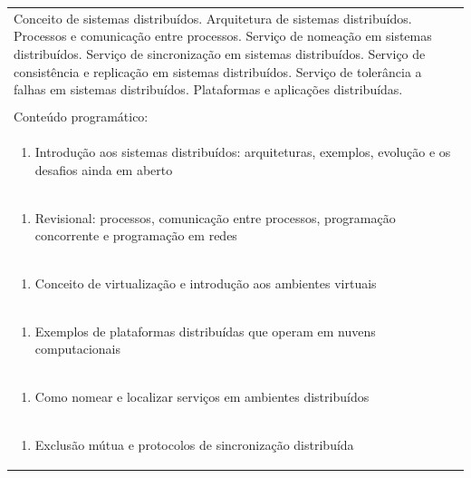 \documentclass[11pt]{article}
\begin{document}
\begin{center}
\begin{longtable}{|p{4cm}|p{4cm}|p{4cm}|p{4cm}|}
\multicolumn{4}{|p{\dimexpr 16cm + 6\tabcolsep\relax}|}{Conceito de sistemas distribuídos. Arquitetura de sistemas distribuídos. Processos e comunicação entre processos. Serviço de nomeação em sistemas distribuídos. Serviço de sincronização em sistemas distribuídos. Serviço de consistência e replicação em sistemas distribuídos. Serviço de tolerância a falhas em sistemas distribuídos. Plataformas e aplicações distribuídas.}\\
\multicolumn{4}{|p{16cm}|}{}\\
\hline
\multicolumn{4}{|p{16cm}|}{Conteúdo programático:}\\*
\multicolumn{4}{|p{\dimexpr 16cm + 6\tabcolsep\relax}|}{\begin{enumerate}[start=1]\item Introdução aos sistemas distribuídos: arquiteturas, exemplos, evolução e os desafios ainda em aberto\end{enumerate}}\\
\multicolumn{4}{|p{\dimexpr 16cm + 6\tabcolsep\relax}|}{\begin{enumerate}[start=2]\item Revisional: processos, comunicação entre processos, programação concorrente e programação em redes\end{enumerate}}\\
\multicolumn{4}{|p{\dimexpr 16cm + 6\tabcolsep\relax}|}{\begin{enumerate}[start=3]\item Conceito de virtualização e introdução aos ambientes virtuais\end{enumerate}}\\
\multicolumn{4}{|p{\dimexpr 16cm + 6\tabcolsep\relax}|}{\begin{enumerate}[start=4]\item Exemplos de plataformas distribuídas que operam em nuvens computacionais\end{enumerate}}\\
\multicolumn{4}{|p{\dimexpr 16cm + 6\tabcolsep\relax}|}{\begin{enumerate}[start=5]\item Como nomear e localizar serviços em ambientes distribuídos\end{enumerate}}\\
\multicolumn{4}{|p{\dimexpr 16cm + 6\tabcolsep\relax}|}{\begin{enumerate}[start=6]\item Exclusão mútua e protocolos de sincronização distribuída\end{enumerate}}\\

\end{longtable}
\end{center}
\end{document}
